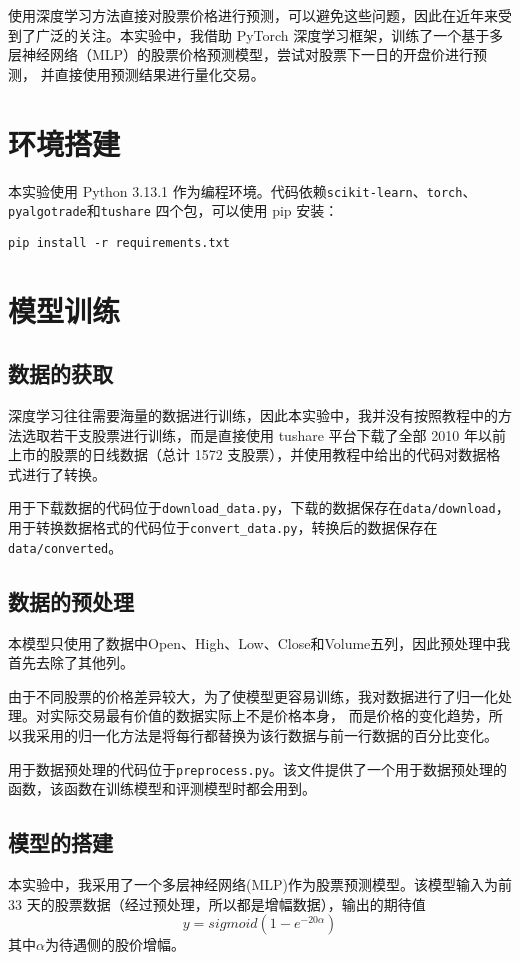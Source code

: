 \documentclass[final,5p,times,twocolumn,authoryear]{elsarticle}
\begin{document}
使用深度学习方法直接对股票价格进行预测，可以避免这些问题，因此在近年来受到了广泛的关注。本实验中，我借助
PyTorch 深度学习框架，训练了一个基于多层神经网络（MLP）的股票价格预测模型，尝试对股票下一日的开盘价进行预测，
并直接使用预测结果进行量化交易。

\section{环境搭建}
本实验使用 Python 3.13.1 作为编程环境。代码依赖\texttt{scikit-learn}、\texttt{torch}、\texttt{pyalgotrade}和\texttt{tushare}
四个包，可以使用 pip 安装：
\begin{verbatim}
pip install -r requirements.txt
\end{verbatim}

\section{模型训练}

\subsection{数据的获取}
深度学习往往需要海量的数据进行训练，因此本实验中，我并没有按照教程中的方法选取若干支股票进行训练，而是直接使用
tushare 平台下载了全部 2010 年以前上市的股票的日线数据（总计 1572 支股票），并使用教程中给出的代码对数据格式进行了转换。

用于下载数据的代码位于\texttt{download\_data.py}，下载的数据保存在\texttt{data/download}，
用于转换数据格式的代码位于\texttt{convert\_data.py}，转换后的数据保存在\texttt{data/converted}。

\subsection{数据的预处理}
本模型只使用了数据中Open、High、Low、Close和Volume五列，因此预处理中我首先去除了其他列。

由于不同股票的价格差异较大，为了使模型更容易训练，我对数据进行了归一化处理。对实际交易最有价值的数据实际上不是价格本身，
而是价格的变化趋势，所以我采用的归一化方法是将每行都替换为该行数据与前一行数据的百分比变化。

用于数据预处理的代码位于\texttt{preprocess.py}。该文件提供了一个用于数据预处理的函数，该函数在训练模型和评测模型时都会用到。

\subsection{模型的搭建}
本实验中，我采用了一个多层神经网络(MLP)作为股票预测模型。该模型输入为前 33 天的股票数据（经过预处理，所以都是增幅数据），输出的期待值
\begin{equation}
       y = sigmoid(1 - e^{-20\alpha})
\end{equation}
其中\(\alpha\)为待遇侧的股价增幅。
\end{document}
